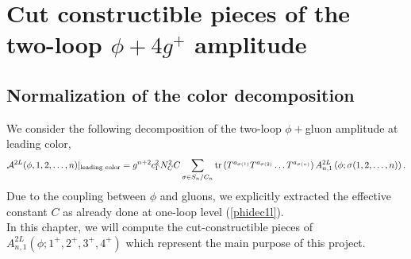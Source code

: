 \chapter{Cut constructible pieces of the two-loop $\phi+4g^+$ amplitude}	\label{ch:cuts}
\section{Normalization of the color decomposition}
\iffalse
 we used the following color organization for one-loop amplitudes:
$$
	\mathcal{A}^{1L}(\phi;1,2,\dots,n)=g^nC\,c_\Gamma \sum_{c=1}^{\lfloor n/2 \rfloor+1} \sum_\sigma Gr_{n;c} A^{1L}_{n,c}\left(\phi;\sigma(1,2,\dots,n)\right).
$$
where $\lfloor x \rfloor$ is the largest integer less than or equal to $x$. The decomposition of the two-loop $\phi+$gluon amplitude 
will be
$$
	\mathcal{A}^{2L}(\phi,1,2,\dots,n)=g^{n+2} c_\Gamma^2 N_C \sum_{c=1}^{\lfloor n/2 \rfloor+1} \sum_\sigma Gr_{n;c} A^{2L}_{n,c}\left(\phi;\sigma(1,2,\dots,n)\right)
$$
Keeping in mind that
$$
	Gr_{n;1}(1)=N_C \Tr\left(T^{a_1}T^{a_2}\dots T^{a_n}\right),
$$
the unrenormalized amplitude
\fi
We consider the following decomposition of the two-loop $\phi+$gluon amplitude at leading color,
\begin{align}
	\mathcal{A}^{2L}(\phi,1,2,\dots,n)|_{\text{leading color}}=g^{n+2} c_\Gamma^2 N_C^2 C \sum_{\sigma\in S_n/C_n} \tr\left(T^{a_{\sigma(1)}}T^{a_{\sigma(2)}}\dots T^{a_{\sigma(n)}}\right)A^{2L}_{n,1}\left(\phi;\sigma(1,2,\dots,n)\right).	\label{Cgdec}
\end{align}
Due to the coupling between $\phi$ and gluons, we explicitly extracted the effective constant $C$ as already done at one-loop level (\ref{phidec1l}).\\
In this chapter, we will compute the cut-constructible pieces of $A^{2L}_{n,1}\left(\phi;1^+,2^+,3^+,4^+\right)$ which represent the main purpose of this project.
